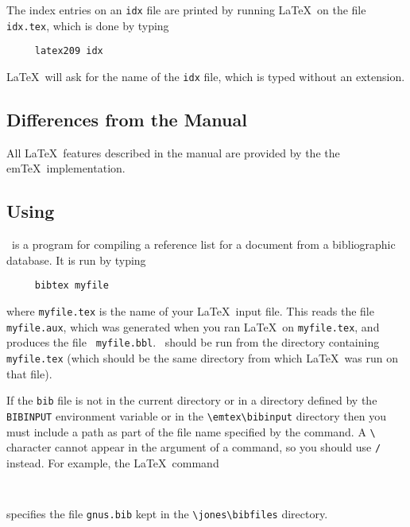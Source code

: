 The index entries on an {\tt idx} file are printed by running \LaTeX\
on the file \mbox{\tt idx.tex}, which is done by typing
\begin{verbatim}
     latex209 idx
\end{verbatim}
\LaTeX\ will ask for the name of the {\tt idx} file, which is typed
without an extension.
 
 
 
\subsection{Differences from the Manual}
 
All \LaTeX\ features described in the manual are provided by 
the the em\TeX\ implementation.
 
 
 
 
 
\subsection{Using \BibTeX}
 
\BibTeX\ is a program for compiling a reference list for a document
from a bibliographic database.  It is run by typing
\begin{verbatim}
     bibtex myfile
\end{verbatim}
where \mbox{\tt myfile.tex} is the name of your \LaTeX\ input file.
This reads the file \mbox{\tt myfile.aux}, which was generated when you
ran \LaTeX\ on \mbox{\tt myfile.tex}, and produces the file \mbox{\tt
myfile.bbl}.  \BibTeX\ should be run from the directory containing
\mbox{\tt myfile.tex} (which should be the same directory from which
\LaTeX\ was run on that file).
 
If the {\tt bib} file is not in the current directory or in a directory
defined by the \verb|BIBINPUT| environment variable or in the
\verb|\emtex\bibinput| directory
then you must include a path as part of the file name specified
by the \hbox{\verb||} command.  A \verb|\| character cannot
appear in the argument of a \hbox{\verb||} command, so you
should use \verb|/| instead.  For example, the \LaTeX\ command
\begin{verbatim}
     
\end{verbatim}
specifies the file \mbox{\tt gnus.bib} kept in the \verb|\jones\bibfiles|
directory.
 
